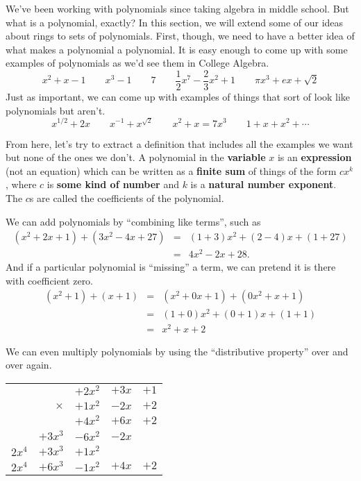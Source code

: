 We've been working with polynomials since taking algebra in middle school. But what is a polynomial, exactly? In this section, we will extend some of our ideas about rings to sets of polynomials. First, though, we need to have a better idea of what makes a polynomial a polynomial. It is easy enough to come up with some examples of polynomials as we'd see them in College Algebra.
\[ x^2 + x - 1 \quad\quad x^3 - 1 \quad\quad 7 \quad\quad \frac{1}{2}x^7 - \frac{2}{3}x^2 + 1 \quad\quad \pi x^3 + e x + \sqrt{2} \]
Just as important, we can come up with examples of things that sort of look like polynomials but aren't.
\[ x^{1/2} + 2x \quad\quad x^{-1} + x^{\sqrt{2}} \quad\quad x^2 + x = 7x^3  \quad\quad 1 + x + x^2 + \cdots \]

From here, let's try to extract a definition that includes all the examples we want but none of the ones we don't. A polynomial in the \textbf{variable} \(x\) is an \textbf{expression} (not an equation) which can be written as a \textbf{finite sum} of things of the form \(cx^k\), where \(c\) is \textbf{some kind of number} and \(k\) is a \textbf{natural number exponent}. The \(c\)s are called the coefficients of the polynomial.

We can add polynomials by ``combining like terms'', such as
\begin{eqnarray*}
(x^2 + 2x + 1) + (3x^2 - 4x + 27) & = & (1+3)x^2 + (2 - 4)x + (1 + 27) \\
 & = & 4x^2 - 2x + 28.
\end{eqnarray*}
And if a particular polynomial is ``missing'' a term, we can pretend it is there with coefficient zero.
\begin{eqnarray*}
(x^2 + 1) + (x + 1) & = & (x^2 + 0x + 1) + (0x^2 + x + 1) \\
 & = & (1+0)x^2 + (0+1)x + (1+1) \\
 & = & x^2 + x + 2
\end{eqnarray*}

We can even multiply polynomials by using the ``distributive property'' over and over again.

\begin{center}
\begin{tabular}{rrrrr}
         &            & \(+2x^2\) & \(+3x\) & \(+1\) \\
         & \(\times\) & \(+1x^2\) & \(-2x\) & \(+2\) \\ \hline
         &            & \(+4x^2\) & \(+6x\) & \(+2\) \\
         & \(+3x^3\)  & \(-6x^2\) & \(-2x\) &        \\
\(2x^4\) & \(+3x^3\)  & \(+1x^2\) &         &        \\ \hline
\(2x^4\) & \(+6x^3\)  & \(-1x^2\) & \(+4x\) & \(+2\)
\end{tabular}
\end{center}

